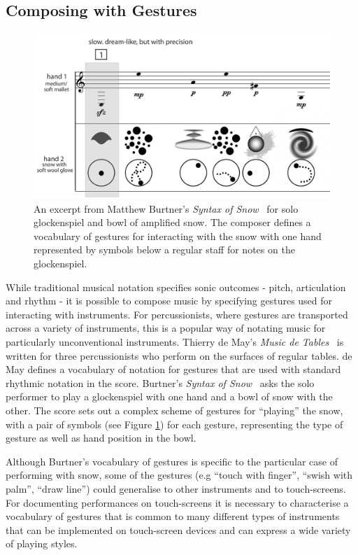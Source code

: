 \documentclass[graybox]{svmult}
\begin{document}
\subsection{Composing with Gestures}
\label{subsec:composing-gestures}

\begin{figure}
\begin{center}
\includegraphics[width=0.7\columnwidth]{figures/syntaxofsnow-excerpt-bw}
\end{center}
\caption{An excerpt from Matthew Burtner's \emph{Syntax of
    Snow}~\cite{Burtner:2011fk} for solo glockenspiel and bowl of
  amplified snow. The composer defines a vocabulary of
  gestures for interacting with the snow with one hand represented by
  symbols below a regular staff for notes on the glockenspiel.}
\label{fig:SyntaxOfSnow}
\end{figure}

While traditional musical notation specifies sonic outcomes - pitch,
articulation and rhythm - it is possible to compose music by
specifying gestures used for interacting with instruments. For
percussionists, where gestures are transported across a variety of
instruments, this is a popular way of notating music for particularly
unconventional instruments. Thierry de May's \emph{Music
de Tables}~\cite{May:1987fk} is written for three percussionists who
perform on the surfaces of regular tables. de May defines a vocabulary
of notation for gestures that are used with standard rhythmic notation
in the score. Burtner's \emph{Syntax of Snow}~\cite{Burtner:2011fk}
asks the solo performer to play a glockenspiel with one hand and a
bowl of snow with the other. The score sets out a complex scheme of
gestures for ``playing'' the snow, with a pair of symbols (see Figure
\ref{fig:SyntaxOfSnow}) for each gesture, representing the type of
gesture as well as hand position in the bowl. 

Although Burtner's vocabulary of gestures is specific to the
particular case of performing with snow, some of the gestures (e.g
``touch with finger'', ``swish with palm'', ``draw line'') could
generalise to other instruments and to touch-screens. For documenting
performances on touch-screens it is necessary to characterise a
vocabulary of gestures that is common to many different types of
instruments that can be implemented on touch-screen devices and can
express a wide variety of playing styles.
\end{document}
